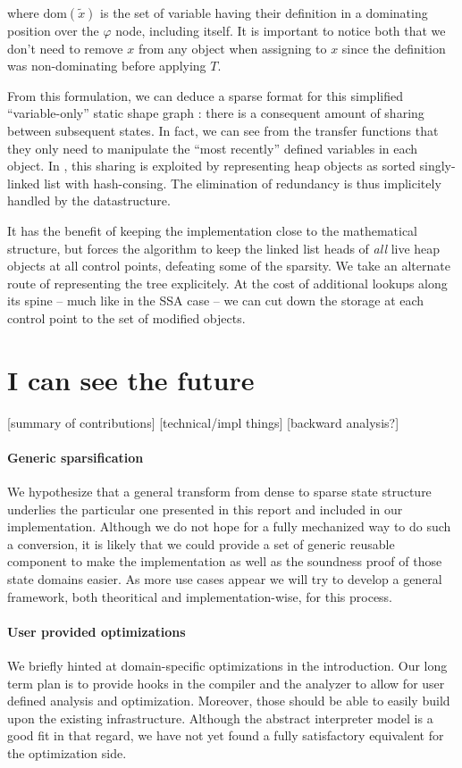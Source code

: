 \documentclass[11pt]{article}
\renewcommand{\phi}{\varphi}
\begin{document}
where $\text{dom}(\tilde{x})$ is the set of variable having their definition in a dominating position over the $\phi$ node, including itself. It is important to notice both that we don't need to remove $x$ from any object when assigning to $x$ since the definition was non-dominating before applying $T$.

From this formulation, we can deduce a sparse format for this simplified ``variable-only'' static shape graph : there is a consequent amount of sharing between subsequent states. In fact, we can see from the transfer functions that they only need to manipulate the ``most recently'' defined variables in each object.
 In \cite{ssa-alias}, this sharing is exploited by representing heap objects as sorted singly-linked list with hash-consing. The elimination of redundancy is thus implicitely handled by the datastructure.

It has the benefit of keeping the implementation close to the mathematical structure, but forces the algorithm to keep the linked list heads of \emph{all} live heap objects at all control points, defeating some of the sparsity.
We take an alternate route of representing the tree explicitely. At the cost of additional lookups along its spine -- much like in the SSA case -- we can cut down the storage at each control point to the set of modified objects.


\section*{I can see the future}

[summary of contributions] [technical/impl things] [backward analysis?]

\paragraph{Generic sparsification} We hypothesize that a general transform from dense to sparse state structure underlies the particular one presented in this report and included in our implementation.
Although we do not hope for a fully mechanized way to do such a conversion, it is likely that we could provide a set of generic reusable component to make the implementation as well as the soundness proof of those state domains easier.
As more use cases appear we will try to develop a general framework, both theoritical and implementation-wise, for this process.

\paragraph{User provided optimizations} We briefly hinted at domain-specific optimizations in the introduction.
Our long term plan is to provide hooks in the compiler and the analyzer to allow for user defined analysis and optimization.
Moreover, those should be able to easily build upon the existing infrastructure.
Although the abstract interpreter model is a good fit in that regard, we have not yet found a fully satisfactory equivalent for the optimization side.
\end{document}

